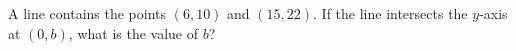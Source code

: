 A line contains the points $(6,10)$ and $(15,22)$. If the line intersects the $y$-axis at $(0,b)$, what is the value of $b$?
